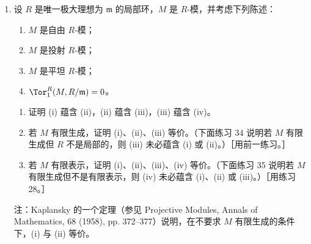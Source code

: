 \begin{enumerate}[label=\arabic*.,resume]
  \item 设 $R$ 是唯一极大理想为 $\mathfrak m$ 的局部环，$M$ 是 $R$-模，并考虑下列陈述：
  \begin{enumerate}[label=(\roman*)]
    \item $M$ 是自由 $R$-模；
    \item $M$ 是投射 $R$-模；
    \item $M$ 是平坦 $R$-模；
    \item $\Tor_1^R(M,R/\mathfrak m)=0$。
  \end{enumerate}
  \begin{enumerate}[label=(\alph*)]
    \item 证明 (i) 蕴含 (ii)，(ii) 蕴含 (iii)，(iii) 蕴含 (iv)。
    \item 若 $M$ 有限生成，证明 (i)、(ii)、(iii) 等价。（下面练习 34 说明若 $M$ 有限生成但 $R$ 不是局部的，则 (iii) 未必蕴含 (i) 或 (ii)。）［用前一练习。］
    \item 若 $M$ 有限表示，证明 (i)、(ii)、(iii)、(iv) 等价。（下面练习 35 说明若 $M$ 有限生成但不是有限表示，则 (iv) 未必蕴含 (i)、(ii) 或 (iii)。）［用练习 28。］
  \end{enumerate}
  注：Kaplansky 的一个定理（参见 Projective Modules, Annals of Mathematics, 68 (1958), pp. 372--377）说明，在不要求 $M$ 有限生成的条件下，(i) 与 (ii) 等价。


\end{enumerate}
